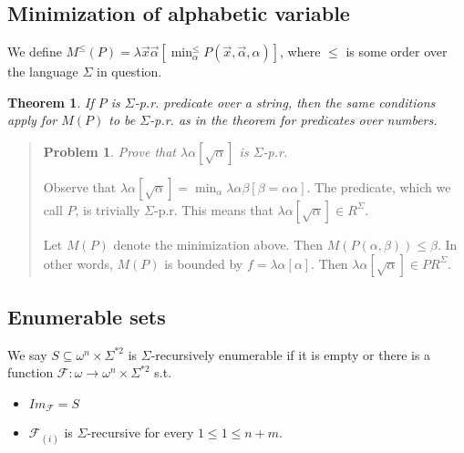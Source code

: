 \documentclass[a4paper, 12pt]{article}
\newtheorem{problem}{Problem}
\newtheorem{theorem}{Theorem}
\newtheorem{problem}{Problem}
\newtheorem{theorem}{Theorem}
\begin{document}
\subsection{Minimization of alphabetic variable}

We define $M^{\leq}(P) = \lambda \overrightarrow{x} \overrightarrow{\alpha}
\left[ \min_{\alpha}^{\leq} P(\overrightarrow{x}, \overrightarrow{\alpha},
\alpha) \right] $, where $\leq$ is some order over the language $\Sigma$ in
question.

\begin{theorem}
    If $P$ is $\Sigma$-p.r. predicate over a string, then the same conditions
    apply for $M(P)$ to be $\Sigma$-p.r. as in the theorem for predicates over
    numbers.
\end{theorem}


\small
\begin{quote}


\begin{problem}
    Prove that $\lambda \alpha[\sqrt{\alpha} ]$ is $\Sigma$-p.r.
\end{problem}

Observe that $\lambda \alpha \left[ \sqrt{\alpha}  \right] = \min_{\alpha}
\lambda \alpha \beta [\beta = \alpha \alpha]$. The predicate, which we call $P$,
is trivially $\Sigma$-p.r. This means that $\lambda \alpha[\sqrt{ \alpha } ] \in
R^{\Sigma}$. 

Let $M(P)$ denote the minimization above. Then $M\left(P\left(\alpha,
\beta\right)\right) \leq \beta$. In other words, $M(P)$ is bounded by $f =
\lambda \alpha [\alpha]$. Then $\lambda \alpha [\sqrt{\alpha} ] \in
PR^{\Sigma}$.

\end{quote}
\normalsize


\subsection{Enumerable sets}

We say $S \subseteq \omega^n \times \Sigma^{*2}$ is $\Sigma$-recursively
enumerable if it is empty or there is a function $\mathcal{F} : \omega \to
\omega^n \times \Sigma^{*2}$ s.t.

\begin{itemize}
    \item $Im_{\mathcal{F}} = S$ 
    \item $\mathcal{F}_{(i)}$ is $\Sigma$-recursive for every $1 \leq 1 \leq n + m$.
\end{itemize}
\end{document}
